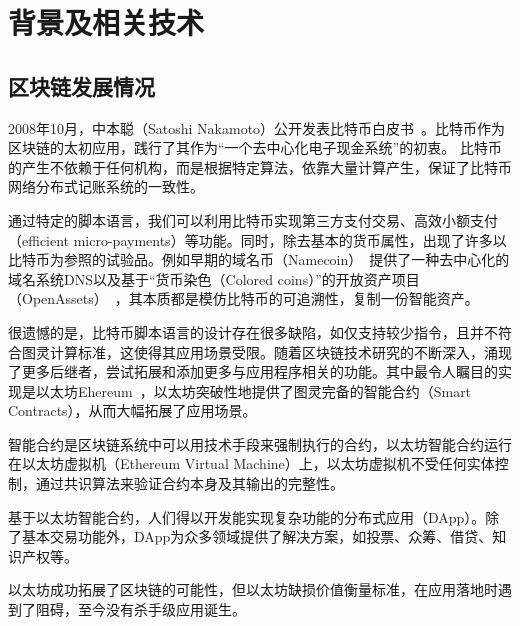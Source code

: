
\section{背景及相关技术}



\subsection{区块链发展情况}
2008年10月，中本聪（Satoshi Nakamoto）公开发表比特币白皮书~\cite{Nakamoto2008}。比特币作为区块链的太初应用，践行了其作为“一个去中心化电子现金系统”的初衷。 比特币的产生不依赖于任何机构，而是根据特定算法，依靠大量计算产生，保证了比特币网络分布式记账系统的一致性。

通过特定的脚本语言，我们可以利用比特币实现第三方支付交易、高效小额支付（efficient micro-payments）等功能。同时，除去基本的货币属性，出现了许多以比特币为参照的试验品。例如早期的域名币（Namecoin）~\cite{Namecoin}提供了一种去中心化的域名系统DNS以及基于“货币染色（Colored coins）”的开放资产项目（OpenAssets）~\cite{OpenAssets}，其本质都是模仿比特币的可追溯性，复制一份智能资产。


很遗憾的是，比特币脚本语言的设计存在很多缺陷，如仅支持较少指令，且并不符合图灵计算标准，这使得其应用场景受限。随着区块链技术研究的不断深入，涌现了更多后继者，尝试拓展和添加更多与应用程序相关的功能。其中最令人瞩目的实现是以太坊Ehereum~\cite{buterin2013ethereum}，以太坊突破性地提供了图灵完备的智能合约（Smart Contracts），从而大幅拓展了应用场景。

智能合约是区块链系统中可以用技术手段来强制执行的合约，以太坊智能合约运行在以太坊虚拟机（Ethereum Virtual Machine）上，以太坊虚拟机不受任何实体控制，通过共识算法来验证合约本身及其输出的完整性。

基于以太坊智能合约，人们得以开发能实现复杂功能的分布式应用（DApp）。除了基本交易功能外，DApp为众多领域提供了解决方案，如投票、众筹、借贷、知识产权等。

以太坊成功拓展了区块链的可能性，但以太坊缺损价值衡量标准，在应用落地时遇到了阻碍，至今没有杀手级应用诞生。

